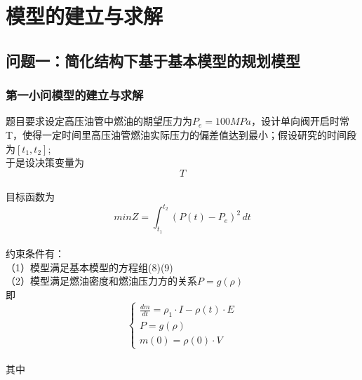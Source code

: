 \documentclass[a4paper]{article}
\begin{document}
	
	\section{模型的建立与求解}
	\subsection{问题一：简化结构下基于基本模型的规划模型}
	\subsubsection{第一小问模型的建立与求解}

题目要求设定高压油管中燃油的期望压力为$P_e=100MPa$，设计单向阀开启时常T，使得一定时间里高压油管燃油实际压力的偏差值达到最小；假设研究的时间段为$[t_1,t_2]
$;
\\于是设决策变量为
\begin{equation}
   T
 \end{equation}
\\目标函数为
\begin{equation}
minZ=\int_{t_1}^{t_2}(P(t)-P_e)^2  \,dt 
 \end{equation}
\\约束条件有：
\\（1）模型满足基本模型的方程组(8)(9)
\\（2）模型满足燃油密度和燃油压力方的关系$P=g(\rho )$
\\即
\begin{equation}
\begin{cases}
	\frac{dm}{dt}=\rho_1\cdot I-\rho(t)\cdot E \\
P=g(\rho )\\
m(0)=\rho (0) \cdot  V
\end{cases}
\end{equation}
\\其中
\end{document}
